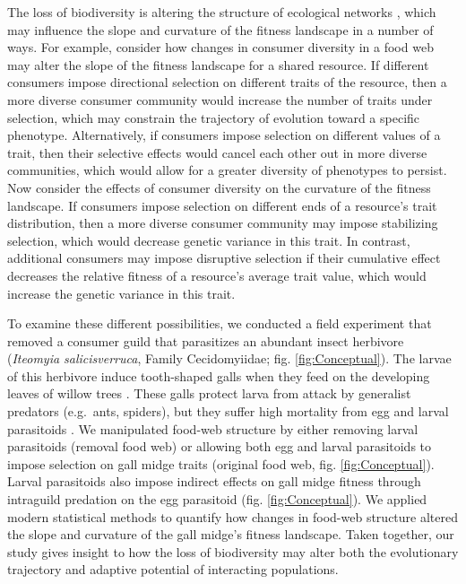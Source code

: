\documentclass[11pt,]{article}
\begin{document}
The loss of biodiversity is altering the structure of ecological
networks \citep{Landi2018ComplexityStability}, which may influence the
slope and curvature of the fitness landscape in a number of ways. For
example, consider how changes in consumer diversity in a food web may
alter the slope of the fitness landscape for a shared resource. If
different consumers impose directional selection on different traits of
the resource, then a more diverse consumer community would increase the
number of traits under selection, which may constrain the trajectory of
evolution toward a specific phenotype. Alternatively, if consumers
impose selection on different values of a trait, then their selective
effects would cancel each other out in more diverse communities, which
would allow for a greater diversity of phenotypes to persist. Now
consider the effects of consumer diversity on the curvature of the
fitness landscape. If consumers impose selection on different ends of a
resource's trait distribution, then a more diverse consumer community
may impose stabilizing selection, which would decrease genetic variance
in this trait. In contrast, additional consumers may impose disruptive
selection if their cumulative effect decreases the relative fitness of a
resource's average trait value, which would increase the genetic
variance in this trait.

To examine these different possibilities, we conducted a field
experiment that removed a consumer guild that parasitizes an abundant
insect herbivore (\emph{Iteomyia salicisverruca}, Family Cecidomyiidae;
fig. \ref{fig:Conceptual}). The larvae of this herbivore induce
tooth-shaped galls when they feed on the developing leaves of willow
trees \citep[\emph{Salix} sp.,][]{Russo2006}. These galls protect larva
from attack by generalist predators (e.g.~ants, spiders), but they
suffer high mortality from egg and larval parasitoids
\citep{Barbour2016}. We manipulated food-web structure by either
removing larval parasitoids (removal food web) or allowing both egg and
larval parasitoids to impose selection on gall midge traits (original
food web, fig. \ref{fig:Conceptual}). Larval parasitoids also impose
indirect effects on gall midge fitness through intraguild predation on
the egg parasitoid (fig. \ref{fig:Conceptual}). We applied modern
statistical methods to quantify how changes in food-web structure
altered the slope and curvature of the gall midge's fitness landscape.
Taken together, our study gives insight to how the loss of biodiversity
may alter both the evolutionary trajectory and adaptive potential of
interacting populations.
\end{document}
